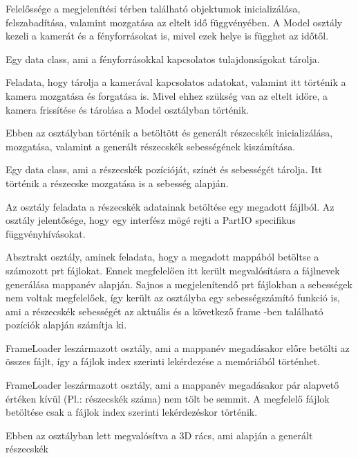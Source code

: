 \begin{description}[font=\normalfont\itshape\bfseries\space]
\item[Model:] 
Felelőssége a megjelenítési térben található objektumok inicializálása, 
felszabadítása, valamint mozgatása az eltelt idő függvényében. 
A Model osztály kezeli a kamerát és a fényforrásokat is,
mivel ezek helye is függhet az időtől.
\item[LightSource:] 
Egy data class, 
ami a fényforrásokkal kapcsolatos tulajdonságokat tárolja. 
\item[Camera:] 
Feladata, hogy tárolja a kamerával kapcsolatos adatokat, 
valamint itt történik a kamera mozgatása és forgatása is.
Mivel ehhez szükség van az eltelt időre, 
a kamera frissítése és 
tárolása a {\ttfamily Model} osztályban történik.
\item[ParticleSystem:] 
Ebben az osztályban történik a betöltött és generált részecskék 
inicializálása, mozgatása, 
valamint a generált részecskék sebességének kiszámítása.
\item[Particle:] 
Egy data class, 
ami a részecskék pozícióját, 
színét és sebességét tárolja. 
Itt történik a részecske mozgatása is 
a sebesség alapján.
\item[ParticleArrayLoader:] 
Az osztály feladata a részecskék adatainak betöltése 
egy megadott fájlból.
Az osztály jelentősége, 
hogy egy interfész mögé rejti
a PartIO specifikus függvényhívásokat.
\item[FrameLoader:] 
Absztrakt osztály, aminek feladata, 
hogy a megadott mappából betöltse a számozott prt fájlokat. 
Ennek megfelelően itt került megvalósításra
a fájlnevek generálása mappanév alapján. 
Sajnos a megjelenítendő prt fájlokban a sebességek nem voltak megfelelőek, 
így került az osztályba egy sebességszámító funkció is, 
ami a részecskék sebességét az aktuális 
és a következő frame -ben található pozíciók alapján számítja ki.
\item[LoadBeforeFrameLoader:] 
{\ttfamily FrameLoader} leszármazott osztály, 
ami a mappanév megadásakor előre betölti az összes fájlt, 
így a fájlok index szerinti lekérdezése a memóriából történhet.
\item[LoadRuntimeFrameLoader:] 
{\ttfamily FrameLoader} leszármazott osztály, 
ami a mappanév megadásakor pár alapvető értéken kívül (Pl.: részecskék száma) 
nem tölt be semmit. 
A megfelelő fájlok betöltése csak a fájlok index szerinti lekérdezéskor történik.
\item[Array3D:] Ebben az osztályban lett megvalósítva a 3D rács, 
ami alapján a generált részecskék 

\end{description}

